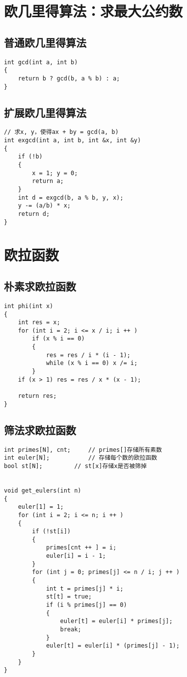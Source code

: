 \documentclass[12pt,a4paper,UTF16]{ctexbook}
\theoremstyle{plain}
\begin{document}
\section{欧几里得算法：求最大公约数}
\subsection{普通欧几里得算法}
\begin{lstlisting}
int gcd(int a, int b)
{
    return b ? gcd(b, a % b) : a;
}
\end{lstlisting}
\subsection{扩展欧几里得算法}
\begin{lstlisting}
// 求x, y，使得ax + by = gcd(a, b)
int exgcd(int a, int b, int &x, int &y)
{
    if (!b)
    {
        x = 1; y = 0;
        return a;
    }
    int d = exgcd(b, a % b, y, x);
    y -= (a/b) * x;
    return d;
}
\end{lstlisting}

\section{欧拉函数}
\subsection{朴素求欧拉函数}
\begin{lstlisting}
int phi(int x)
{
    int res = x;
    for (int i = 2; i <= x / i; i ++ )
        if (x % i == 0)
        {
            res = res / i * (i - 1);
            while (x % i == 0) x /= i;
        }
    if (x > 1) res = res / x * (x - 1);

    return res;
}
\end{lstlisting}
\subsection{筛法求欧拉函数}
\begin{lstlisting}
int primes[N], cnt;     // primes[]存储所有素数
int euler[N];           // 存储每个数的欧拉函数
bool st[N];         // st[x]存储x是否被筛掉


void get_eulers(int n)
{
    euler[1] = 1;
    for (int i = 2; i <= n; i ++ )
    {
        if (!st[i])
        {
            primes[cnt ++ ] = i;
            euler[i] = i - 1;
        }
        for (int j = 0; primes[j] <= n / i; j ++ )
        {
            int t = primes[j] * i;
            st[t] = true;
            if (i % primes[j] == 0)
            {
                euler[t] = euler[i] * primes[j];
                break;
            }
            euler[t] = euler[i] * (primes[j] - 1);
        }
    }
}
\end{lstlisting}
\end{document}
